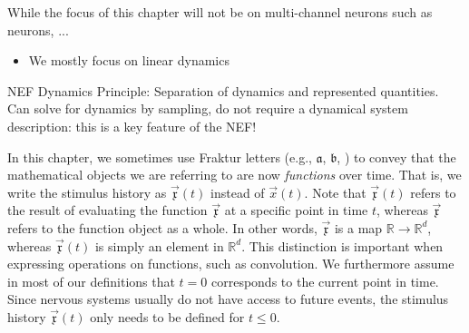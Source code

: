 While the focus of this chapter will not be on multi-channel neurons such as \nlif neurons, ...

\begin{itemize}
	\item We mostly focus on linear dynamics
\end{itemize}

NEF Dynamics Principle: Separation of dynamics and represented quantities.
Can solve for dynamics by sampling, do not require a dynamical system description: this is a key feature of the NEF!

\begin{Notation}
In this chapter, we sometimes use Fraktur letters (e.g., $\mathfrak{a}$, $\mathfrak{b}$, \textellipsis) to convey that the mathematical objects we are referring to are now \emph{functions} over time.
That is, we write the stimulus history as $\vec{\mathfrak{x}}(t)$ instead of $\vec x(t)$.
Note that $\vec{\mathfrak{x}}(t)$ refers to the result of evaluating the function $\vec{\mathfrak{x}}$ at a specific point in time $t$, whereas $\vec{\mathfrak{x}}$ refers to the function object as a whole.
In other words, $\vec{\mathfrak{x}}$ is a map $\mathbb{R} \longrightarrow \mathbb{R}^d$, whereas $\vec{\mathfrak{x}}(t)$ is simply an element in $\mathbb{R}^d$.
This distinction is important when expressing operations on functions, such as convolution.
We furthermore assume in most of our definitions that $t = 0$ corresponds to the current point in time.
Since nervous systems usually do not have access to future events, the stimulus history $\vec{\mathfrak{x}}(t)$ only needs to be defined for $t \leq 0$.
\end{Notation}
